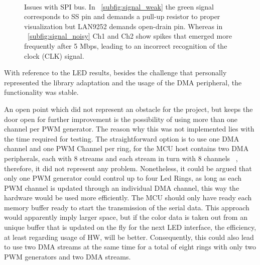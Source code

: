 \begin{figure}[hb]
    \centering
     \\
    \caption{Issues with SPI bus. In ~\ref{subfig:signal_weak} the green signal corresponds to SS pin and demands a pull-up resistor to proper visualization but LAN9252 demands open-drain pin.
            Whereas in ~\ref{subfig:signal_noisy} Ch1 and Ch2 show spikes that emerged more frequently after 5 Mbps, leading to an incorrect recognition of the clock (CLK) signal.}
    \label{fig:signal_noisy}
\end{figure}


With reference to the LED results, besides the challenge that personally represented the library adaptation and the usage of the DMA 
peripheral, the functionality was stable.

An open point which did not represent an obstacle for the project, but keeps the door open for further improvement is 
the possibility of using more than one channel per PWM generator. The reason why this was not implemented lies with 
the time required for testing. The straightforward option is to use one DMA channel and one PWM Channel per ring, 
for the MCU host contains two DMA peripherals, each with 8 streams and each stream in turn with 8 channels ~\cite{stm32f446_data}, 
therefore, it did not represent any problem. 
Nonetheless, it could be argued that only one PWM generator could control up to four Led Rings, as long as each PWM channel is updated through
an individual DMA channel, this way the hardware would be used more efficiently. The MCU should only have ready each memory buffer 
ready to start the transmission of the serial data. This approach would apparently imply larger space, but if the color data 
is taken 
out from an unique buffer that is updated on the fly for the next LED interface, the efficiency, at least regarding usage of HW, will be better. 
Consequently, this could also lead to use two DMA streams at the same time for a total of eight rings with only two PWM generators 
and two DMA streams. 

